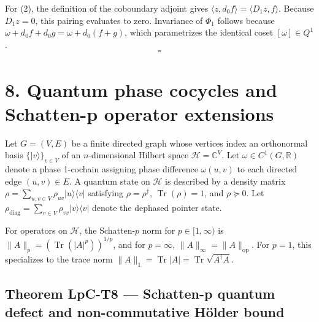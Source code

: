 \documentclass[
]{article}
\begin{document}
For (2), the definition of the coboundary adjoint gives
\(\langle z, d_0 f \rangle = \langle D_1 z, f \rangle\).
Because \(D_1 z = 0\), this pairing evaluates to zero.
Invariance of \(\Phi_1\) follows because \(\omega + d_0 f + d_0 g = \omega + d_0 (f + g)\),
which parametrizes the identical coset \([\omega] \in Q^1\). \[\square\]

\section{8. Quantum phase cocycles and Schatten-p operator extensions}\label{quantum-phase-cocycles-and-schatten-p-operator-extensions}

Let \(G = (V,E)\) be a finite directed graph whose vertices index an orthonormal
basis \(\{|v\rangle\}_{v \in V}\) of an \(n\)-dimensional Hilbert space
\(\mathcal{H} = \mathbb{C}^V\). Let \(\omega \in C^1(G, \mathbb{R})\) denote a
phase 1-cochain assigning phase difference \(\omega(u,v)\) to each directed edge
\((u,v) \in E\). A quantum state on \(\mathcal{H}\) is described by a density matrix
\(\rho = \sum_{u, v \in V} \rho_{uv} |u\rangle\langle v|\) satisfying \(\rho = \rho^\dagger\),
\(\operatorname{Tr}(\rho) = 1\), and \(\rho \succeq 0\). Let
\(\rho_{\text{diag}} = \sum_{v \in V} \rho_{vv} |v\rangle\langle v|\) denote the
dephased pointer state.

For operators on \(\mathcal{H}\), the Schatten-\(p\) norm for \(p \in [1, \infty)\) is
\(\|A\|_p = (\operatorname{Tr}(|A|^p))^{1/p}\), and for \(p = \infty\), \(\|A\|_\infty = \|A\|_{\mathrm{op}}\).
For \(p = 1\), this specializes to the trace norm \(\|A\|_1 = \operatorname{Tr}|A| = \operatorname{Tr}\sqrt{A^\dagger A}\).

\subsection{Theorem LpC-T8 --- Schatten-p quantum defect and non-commutative Hölder bound}\label{theorem-lpc-t8-schatten-p-quantum-defect-and-non-commutative-huxf6lder-bound}
\end{document}
